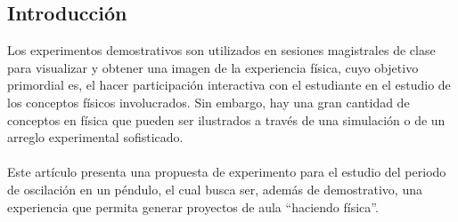 \documentclass[12pt]{article}
\begin{document}
\renewcommand\contentsname{\centering TABLA DE CONTENIDO}
\thispagestyle{empty}
\setcounter{page}{1}
\tableofcontents
\clearpage

\renewcommand\listfigurename{\centering LISTA DE FIGURAS}
\listoffigures
\clearpage



\begin{multicols}{2}

\section{Introducción}
Los experimentos demostrativos son utilizados en sesiones magistrales de clase para visualizar y obtener una imagen de la experiencia física, cuyo objetivo primordial es, el hacer participación interactiva con el estudiante\cite{REDISH} en el estudio de los conceptos físicos involucrados. Sin embargo, hay una gran cantidad de conceptos en física que pueden ser ilustrados a través de una simulación o de un arreglo experimental sofisticado.\\ \\ Este artículo presenta una propuesta de experimento para el estudio del periodo de oscilación en un péndulo, el cual busca ser, además de demostrativo, una experiencia que permita generar proyectos de aula ``haciendo física''.
\\ \\


\end{multicols}
\end{document}
